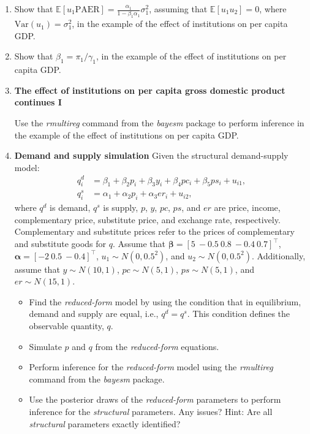 \begin{enumerate}
	\item Show that $\mathbb{E}[u_1\text{PAER}] = \frac{\alpha_1}{1 - \beta_1\alpha_1} \sigma_1^2$, assuming that $\mathbb{E}[u_1 u_2] = 0$, where $\text{Var}(u_1) = \sigma_1^2$, in the example of the effect of institutions on per capita GDP.
	
	\item Show that $\beta_1=\pi_1/\gamma_1$, in the example of the effect of institutions on per capita GDP.
	
	\item \textbf{The effect of institutions on per capita gross domestic product continues I}
	
	Use the \textit{rmultireg} command from the \textit{bayesm} package to perform inference in the example of the effect of institutions on per capita GDP. 
	
	\item \textbf{Demand and supply simulation}
	Given the structural demand-supply model:
\begin{align*}
	q_i^d &= \beta_1 + \beta_2 p_i + \beta_3 y_i + \beta_4 pc_i + \beta_5 ps_i + u_{i1}, \\
	q_i^s &= \alpha_1 + \alpha_2 p_i + \alpha_3 er_i + u_{i2},
\end{align*}
where $q^d$ is demand, $q^s$ is supply, $p$, $y$, $pc$, $ps$, and $er$ are price, income, complementary price, substitute price, and exchange rate, respectively. Complementary and substitute prices refer to the prices of complementary and substitute goods for $q$. Assume that $\bm{\beta} = \left[ 5 \ -0.5 \ 0.8 \ -0.4 \ 0.7 \right]^{\top}$, $\bm{\alpha} = \left[ -2 \ 0.5 \ -0.4 \right]^{\top}$, $u_1 \sim N(0, 0.5^2)$, and $u_2 \sim N(0, 0.5^2)$. Additionally, assume that $y \sim N(10, 1)$, $pc \sim N(5, 1)$, $ps \sim N(5, 1)$, and $er \sim N(15, 1)$.

\begin{itemize}
	\item Find the \textit{reduced-form} model by using the condition that in equilibrium, demand and supply are equal, i.e., $q^d = q^s$. This condition defines the observable quantity, $q$.
	\item Simulate $p$ and $q$ from the \textit{reduced-form} equations.
	\item Perform inference for the \textit{reduced-form} model using the \textit{rmultireg} command from the \textit{bayesm} package.
	\item Use the posterior draws of the \textit{reduced-form} parameters to perform inference for the \textit{structural} parameters. Any issues? Hint: Are all \textit{structural} parameters exactly identified?
\end{itemize}


\end{enumerate}
